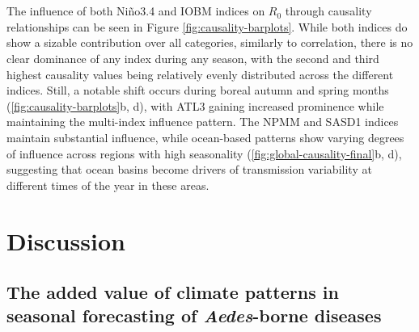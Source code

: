 \documentclass[10pt,twocolumn]{wlscirep}
\begin{document}
\\
\\
The influence of both Niño3.4 and IOBM indices on $R_0$ through causality relationships can be seen in Figure \ref{fig:causality-barplots}. While both indices do show a sizable contribution over all categories, similarly to correlation, there is no clear dominance of any index during any season, with the second and third highest causality values being relatively evenly distributed across the different indices. Still, a notable shift occurs during boreal autumn and spring months (\ref{fig:causality-barplots}b, d), with ATL3 gaining increased prominence while maintaining the multi-index influence pattern. The NPMM and SASD1 indices maintain substantial influence, while ocean-based patterns show varying degrees of influence across regions with high seasonality (\ref{fig:global-causality-final}b, d), suggesting that ocean basins become drivers of transmission variability at different times of the year in these areas.

\section{Discussion} \label{sec-discussion}

\subsection{The added value of climate patterns in seasonal forecasting of \textit{Aedes}-borne diseases} \label{sec-discussion-added-value}
\end{document}
